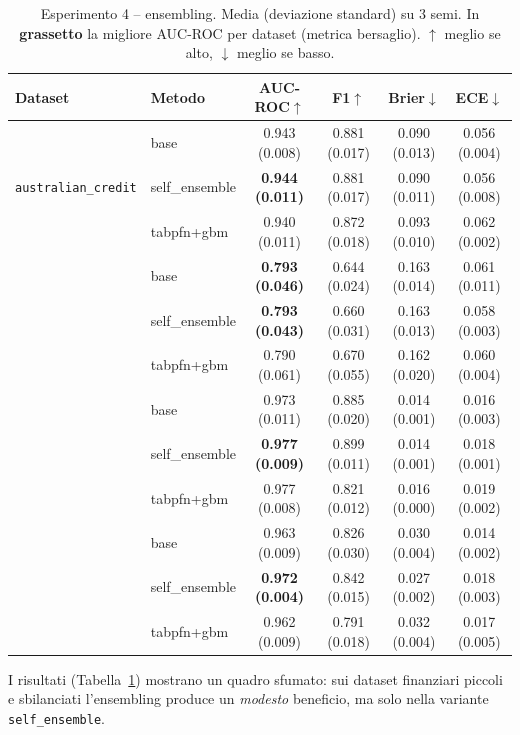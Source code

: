 \documentclass[11pt,a4paper]{article}
\begin{document}
\begin{table}[h]
\centering
\caption{Esperimento 4 -- ensembling. Media (deviazione standard) su $3$ semi.
In \textbf{grassetto} la migliore AUC-ROC per dataset (metrica bersaglio).
$\uparrow$ meglio se alto, $\downarrow$ meglio se basso.}
\label{tab:ensemble}
\small
\setlength{\tabcolsep}{4pt}
\begin{tabular}{llcccc}
\toprule
Dataset & Metodo & AUC-ROC$\uparrow$ & F1$\uparrow$ & Brier$\downarrow$ & ECE$\downarrow$ \\
\midrule
\multirow{3}{*}{\texttt{australian\_credit}}
 & base          & 0.943 (0.008) & 0.881 (0.017) & 0.090 (0.013) & 0.056 (0.004) \\
 & self\_ensemble& \textbf{0.944 (0.011)} & 0.881 (0.017) & 0.090 (0.011) & 0.056 (0.008) \\
 & tabpfn+gbm    & 0.940 (0.011) & 0.872 (0.018) & 0.093 (0.010) & 0.062 (0.002) \\
\addlinespace
\multirow{3}{*}{\texttt{credit\_g}}
 & base          & \textbf{0.793 (0.046)} & 0.644 (0.024) & 0.163 (0.014) & 0.061 (0.011) \\
 & self\_ensemble& \textbf{0.793 (0.043)} & 0.660 (0.031) & 0.163 (0.013) & 0.058 (0.003) \\
 & tabpfn+gbm    & 0.790 (0.061) & 0.670 (0.055) & 0.162 (0.020) & 0.060 (0.004) \\
\addlinespace
\multirow{3}{*}{\texttt{polish\_bankruptcy\_1}}
 & base          & 0.973 (0.011) & 0.885 (0.020) & 0.014 (0.001) & 0.016 (0.003) \\
 & self\_ensemble& \textbf{0.977 (0.009)} & 0.899 (0.011) & 0.014 (0.001) & 0.018 (0.001) \\
 & tabpfn+gbm    & 0.977 (0.008) & 0.821 (0.012) & 0.016 (0.000) & 0.019 (0.002) \\
\addlinespace
\multirow{3}{*}{\texttt{polish\_bankruptcy\_5}}
 & base          & 0.963 (0.009) & 0.826 (0.030) & 0.030 (0.004) & 0.014 (0.002) \\
 & self\_ensemble& \textbf{0.972 (0.004)} & 0.842 (0.015) & 0.027 (0.002) & 0.018 (0.003) \\
 & tabpfn+gbm    & 0.962 (0.009) & 0.791 (0.018) & 0.032 (0.004) & 0.017 (0.005) \\
\bottomrule
\end{tabular}
\end{table}

I risultati (Tabella~\ref{tab:ensemble}) mostrano un quadro sfumato: sui dataset
finanziari piccoli e sbilanciati l'ensembling produce un \emph{modesto} beneficio,
ma solo nella variante \texttt{self\_ensemble}.
\end{document}
